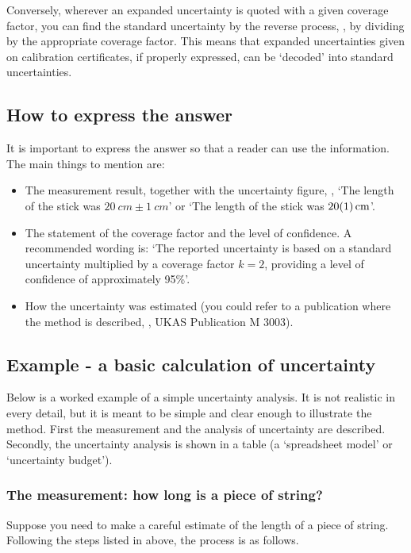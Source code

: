 Conversely, wherever an expanded uncertainty is quoted with a given coverage factor, you can find the standard uncertainty by the reverse process, \ie, by dividing by the appropriate coverage factor. This means that expanded uncertainties given on calibration certificates, if properly expressed, can be `decoded' into standard uncertainties.


\subsection{How to express the answer}
It is important to express the answer so that a reader can use the information. The main things to mention are:
\begin{itemize}
\item The measurement result, together with the uncertainty figure, \eg, `The length of the stick was $\SI{20}{cm}\pm\SI{1}{cm}$' or `The length of the stick was $\SI{20+-1}{cm}$'.
%
\item The statement of the coverage factor and the level of confidence. A recommended wording is: `The reported uncertainty is based on a standard uncertainty multiplied by a coverage factor $k = 2$, providing a level of confidence of approximately 95\%'.
%
\item How the uncertainty was estimated (you could refer to a publication where the method is described, \eg, UKAS Publication M 3003).
\end{itemize}


\subsection{Example - a basic calculation of uncertainty}
Below is a worked example of a simple uncertainty analysis. It is not realistic in every detail, but it is meant to be simple and clear enough to illustrate the method. First the measurement and the analysis of uncertainty are described. Secondly, the uncertainty analysis is shown in a table (a `spreadsheet model' or `uncertainty budget').


\subsubsection{The measurement: how long is a piece of string?}
Suppose you need to make a careful estimate of the length of a piece of string. Following the steps listed in above, the process is as follows.

